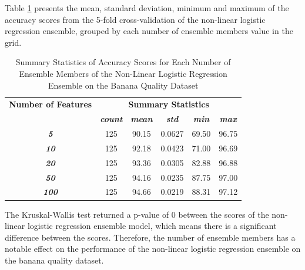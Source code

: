 \documentclass[10pt, conference]{IEEEtran}
\begin{document}
Table \ref{table: BQ_member_nonlinear_performance_metrics} presents the mean, standard deviation, minimum and maximum of the
accuracy scores from the 5-fold cross-validation of the non-linear logistic regression ensemble, grouped by each number of ensemble members
value in the grid.
\begin{table}[H]
    \caption{Summary Statistics of Accuracy Scores for Each Number of Ensemble Members of the Non-Linear Logistic Regression Ensemble on the Banana Quality Dataset}
    \begin{center}
        \begin{tabular}{|c||c|c|c|c|c|}
            \hline
            \textbf{Number of Features}&\multicolumn{5}{|c|}{\textbf{Summary Statistics}} \\
            \cline{2-6}
                                &\textbf{\textit{count}} & \textbf{\textit{mean}} & \textbf{\textit{std}} & \textbf{\textit{min}} & \textbf{\textit{max}}\\
            \hline
            \textbf{\textit{5}}   & 125 & 90.15 & 0.0627 & 69.50 & 96.75 \\
            \textbf{\textit{10}}  & 125 & 92.18 & 0.0423 & 71.00 & 96.69 \\
            \textbf{\textit{20}}  & 125 & 93.36 & 0.0305 & 82.88 & 96.88 \\
            \textbf{\textit{50}}  & 125 & 94.16 & 0.0235 & 87.75 & 97.00 \\
            \textbf{\textit{100}} & 125 & 94.66 & 0.0219 & 88.31 & 97.12 \\
            \hline
        \end{tabular}
    \end{center}
    \label{table: BQ_member_nonlinear_performance_metrics}
\end{table}
The Kruskal-Wallis test returned a p-value of 0 between the scores of the non-linear logistic regression ensemble model,
which means there is a significant difference between the scores. Therefore, the number of ensemble members
has a notable effect on the performance of the non-linear logistic regression ensemble on the banana quality dataset.
\end{document}

